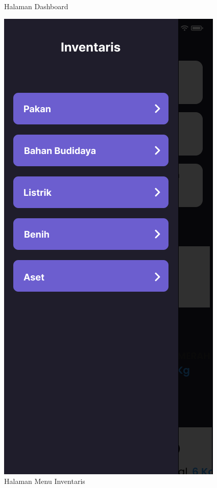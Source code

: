\begin{enumerate}
\begin{enumerate}
\begin{figure}[H]
			  \caption{Halaman Dashboard}
			\endminipage\hfill
			  \includegraphics[width=\linewidth]{gambar/sprint1/mockup_home.png}
			  \caption{Halaman Menu Inventaris}
			\endminipage
			\hspace{.05\linewidth}
		\end{figure}


\end{enumerate}
\end{enumerate}

